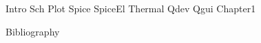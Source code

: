 \documentclass[12pt]{thesis}
\renewcommand{\baselinestretch}{2}
\begin{document}

\pagestyle{plain}
\setcounter{page}{2}

\renewcommand{\baselinestretch}{1}
\small\normalsize

{\hypersetup{linkcolor=blue}
\tableofcontents
}
\newpage

\setlength{\parskip}{0em}
\renewcommand{\baselinestretch}{1}
\small\normalsize

\setcounter{page}{1}
 {Intro}
 {Sch}
 {Plot}
 {Spice}
 {SpiceEl}
 {Thermal}
 {Qdev}
 {Qgui}
 {Chapter1}

 {Bibliography}
\end{document}
